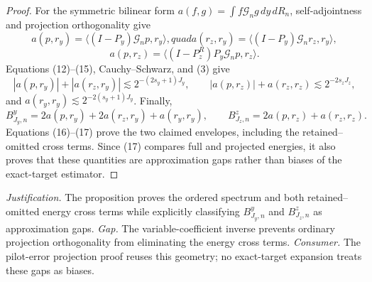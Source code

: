 \documentclass{article}
\begin{document}
\begin{proof}
For the symmetric bilinear form \(a(f,g)=\int f\mathcal G_ng\,dy\,dR_n\), self-adjointness and projection orthogonality give
\[
a(p,r_y)=\langle(I-P_y)\mathcal G_np,r_y\rangle,quad
a(r_z,r_y)=\langle(I-P_y)\mathcal G_nr_z,r_y\rangle,
\]
\[
a(p,r_z)=\langle(I-P_z^R)P_y\mathcal G_np,r_z\rangle. \tag{15}
\]
Equations (12)--(15), Cauchy--Schwarz, and (3) give
\[
|a(p,r_y)|+|a(r_z,r_y)|\lesssim2^{-(2s_y+1)J_y},
\qquad |a(p,r_z)|+a(r_z,r_z)\lesssim2^{-2s_zJ_z}, \tag{16}
\]
and \(a(r_y,r_y)\lesssim2^{-2(s_y+1)J_y}\).  Finally,
\[
B^y_{J_y,n}=2a(p,r_y)+2a(r_z,r_y)+a(r_y,r_y),
\qquad
B^z_{J_z,n}=2a(p,r_z)+a(r_z,r_z). \tag{17}
\]
Equations (16)--(17) prove the two claimed envelopes, including the retained--omitted cross terms.  Since (17) compares full and projected energies, it also proves that these quantities are approximation gaps rather than biases of the exact-target estimator.
\end{proof}
\par\smallskip\noindent \textit{Justification.} The proposition proves the ordered spectrum and both retained--omitted energy cross terms while explicitly classifying \(B^y_{J_y,n}\) and \(B^z_{J_z,n}\) as approximation gaps. \textit{Gap.} The variable-coefficient inverse prevents ordinary projection orthogonality from eliminating the energy cross terms. \textit{Consumer.} The pilot-error projection proof reuses this geometry; no exact-target expansion treats these gaps as biases.
\end{document}
